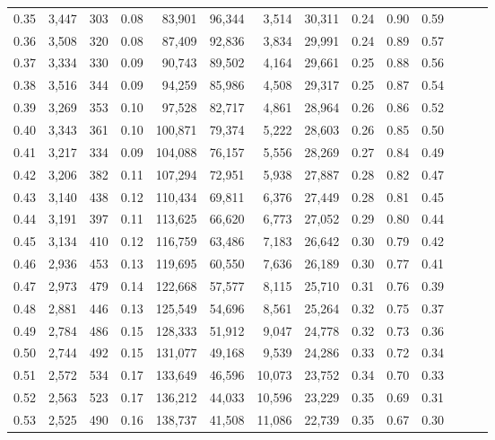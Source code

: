 \begin{tabular}{rrrrrrrrrrrrrr}
0.35 &  3,447 &  303 &  0.08 &   83,901 &   96,344 &   3,514 &  30,311 &  0.24 &  0.90 &      0.59 \\
0.36 &  3,508 &  320 &  0.08 &   87,409 &   92,836 &   3,834 &  29,991 &  0.24 &  0.89 &      0.57 \\
0.37 &  3,334 &  330 &  0.09 &   90,743 &   89,502 &   4,164 &  29,661 &  0.25 &  0.88 &      0.56 \\
0.38 &  3,516 &  344 &  0.09 &   94,259 &   85,986 &   4,508 &  29,317 &  0.25 &  0.87 &      0.54 \\
0.39 &  3,269 &  353 &  0.10 &   97,528 &   82,717 &   4,861 &  28,964 &  0.26 &  0.86 &      0.52 \\
0.40 &  3,343 &  361 &  0.10 &  100,871 &   79,374 &   5,222 &  28,603 &  0.26 &  0.85 &      0.50 \\
0.41 &  3,217 &  334 &  0.09 &  104,088 &   76,157 &   5,556 &  28,269 &  0.27 &  0.84 &      0.49 \\
0.42 &  3,206 &  382 &  0.11 &  107,294 &   72,951 &   5,938 &  27,887 &  0.28 &  0.82 &      0.47 \\
0.43 &  3,140 &  438 &  0.12 &  110,434 &   69,811 &   6,376 &  27,449 &  0.28 &  0.81 &      0.45 \\
0.44 &  3,191 &  397 &  0.11 &  113,625 &   66,620 &   6,773 &  27,052 &  0.29 &  0.80 &      0.44 \\
0.45 &  3,134 &  410 &  0.12 &  116,759 &   63,486 &   7,183 &  26,642 &  0.30 &  0.79 &      0.42 \\
0.46 &  2,936 &  453 &  0.13 &  119,695 &   60,550 &   7,636 &  26,189 &  0.30 &  0.77 &      0.41 \\
0.47 &  2,973 &  479 &  0.14 &  122,668 &   57,577 &   8,115 &  25,710 &  0.31 &  0.76 &      0.39 \\
0.48 &  2,881 &  446 &  0.13 &  125,549 &   54,696 &   8,561 &  25,264 &  0.32 &  0.75 &      0.37 \\
0.49 &  2,784 &  486 &  0.15 &  128,333 &   51,912 &   9,047 &  24,778 &  0.32 &  0.73 &      0.36 \\
0.50 &  2,744 &  492 &  0.15 &  131,077 &   49,168 &   9,539 &  24,286 &  0.33 &  0.72 &      0.34 \\
0.51 &  2,572 &  534 &  0.17 &  133,649 &   46,596 &  10,073 &  23,752 &  0.34 &  0.70 &      0.33 \\
0.52 &  2,563 &  523 &  0.17 &  136,212 &   44,033 &  10,596 &  23,229 &  0.35 &  0.69 &      0.31 \\
0.53 &  2,525 &  490 &  0.16 &  138,737 &   41,508 &  11,086 &  22,739 &  0.35 &  0.67 &      0.30 \\

\end{tabular}
